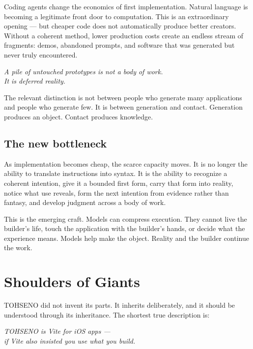 \documentclass[11pt]{article}
\newenvironment{creed}
  {\begin{center}\begin{minipage}{0.86\textwidth}\itshape\large\centering}
  {\end{minipage}\end{center}\vspace{0.4em}}
\newcommand{\TOH}{TOHSENO}
\begin{document}
Coding agents change the economics of first implementation. Natural
language is becoming a legitimate front door to computation. This is an
extraordinary opening --- but cheaper code does not automatically produce
better creators. Without a coherent method, lower production costs
create an endless stream of fragments: demos, abandoned prompts, and
software that was generated but never truly encountered.

\begin{creed}
A pile of untouched prototypes is not a body of work.\\
It is deferred reality.
\end{creed}

The relevant distinction is not between people who generate many
applications and people who generate few. It is between generation and
contact. Generation produces an object. Contact produces knowledge.

\subsection{The new bottleneck}

As implementation becomes cheap, the scarce capacity moves. It is no
longer the ability to translate instructions into syntax. It is the
ability to recognize a coherent intention, give it a bounded first form,
carry that form into reality, notice what use reveals, form the next
intention from evidence rather than fantasy, and develop judgment across
a body of work.

This is the emerging craft. Models can compress execution. They cannot
live the builder's life, touch the application with the builder's hands,
or decide what the experience means. Models help make the object.
Reality and the builder continue the work.

\section{Shoulders of Giants}

\TOH{} did not invent its parts. It inherits deliberately, and it should
be understood through its inheritance. The shortest true description is:

\begin{creed}
\TOH{} is Vite for iOS apps ---\\
if Vite also insisted you use what you build.
\end{creed}
\end{document}
